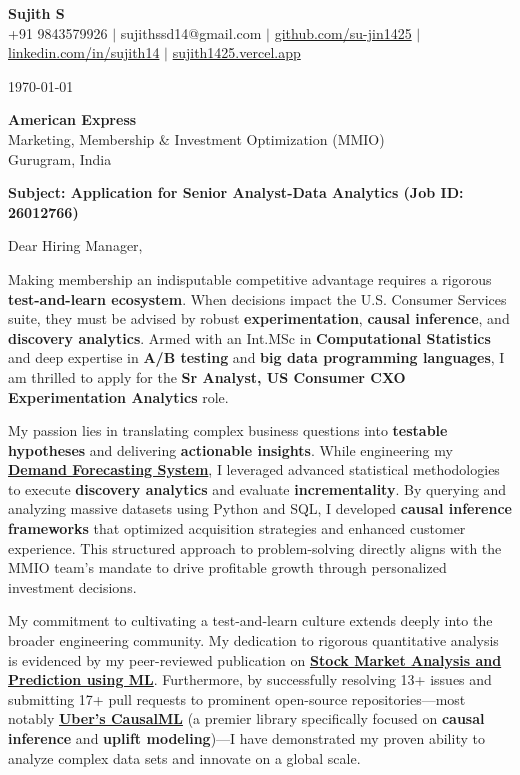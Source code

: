 \documentclass[a4paper,11pt]{article}
\newcommand{\ulink}[2]{\href{#1}{#2}}
\begin{document}
\pagestyle{empty}

\begin{center}
{\color[HTML]{000000}\fontsize{30}{35}\selectfont\bfseries Sujith S} \\[5pt]
{\fontsize{10.5}{12.5}\selectfont\textcolor[HTML]{3A3A3A}{+91 9843579926 $|$ sujithssd14@gmail.com $|$ \ulink{https://github.com/su-jin1425}{github.com/su-jin1425} $|$ \ulink{https://linkedin.com/in/sujith14}{linkedin.com/in/sujith14} $|$ \ulink{https://sujith1425.vercel.app}{sujith1425.vercel.app}}}
\end{center}

\vspace{10pt}

\today

\textbf{American Express} \\
Marketing, Membership \& Investment Optimization (MMIO) \\
Gurugram, India

\textbf{Subject: Application for Senior Analyst-Data Analytics (Job ID: 26012766)}

Dear Hiring Manager,

Making membership an indisputable competitive advantage requires a rigorous \textbf{test-and-learn ecosystem}. When decisions impact the U.S. Consumer Services suite, they must be advised by robust \textbf{experimentation}, \textbf{causal inference}, and \textbf{discovery analytics}. Armed with an Int.MSc in \textbf{Computational Statistics} and deep expertise in \textbf{A/B testing} and \textbf{big data programming languages}, I am thrilled to apply for the \textbf{Sr Analyst, US Consumer CXO Experimentation Analytics} role.

My passion lies in translating complex business questions into \textbf{testable hypotheses} and delivering \textbf{actionable insights}. While engineering my \ulink{https://github.com/su-jin1425/Demand-Forecasting-System}{\textbf{Demand Forecasting System}}, I leveraged advanced statistical methodologies to execute \textbf{discovery analytics} and evaluate \textbf{incrementality}. By querying and analyzing massive datasets using Python and SQL, I developed \textbf{causal inference frameworks} that optimized acquisition strategies and enhanced customer experience. This structured approach to problem-solving directly aligns with the MMIO team's mandate to drive profitable growth through personalized investment decisions.

My commitment to cultivating a test-and-learn culture extends deeply into the broader engineering community. My dedication to rigorous quantitative analysis is evidenced by my peer-reviewed publication on \ulink{https://www.elruha.org/_files/ugd/614b1f_6b95e1b697bf452b9907ba46e0151c05.pdf\#page=774}{\textbf{Stock Market Analysis and Prediction using ML}}. Furthermore, by successfully resolving 13+ issues and submitting 17+ pull requests to prominent open-source repositories---most notably \ulink{https://github.com/uber/causalml}{\textbf{Uber's CausalML}} (a premier library specifically focused on \textbf{causal inference} and \textbf{uplift modeling})---I have demonstrated my proven ability to analyze complex data sets and innovate on a global scale. 
\end{document}
